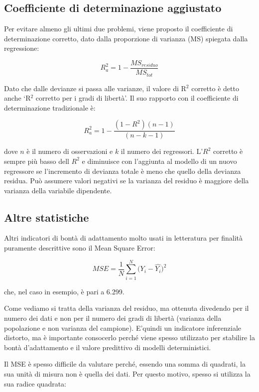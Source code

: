 \documentclass[a4paper,12pt,oneside]{book}
\theoremstyle{definition}
\theoremstyle{definition}
\theoremstyle{definition}
\theoremstyle{remark}
\begin{document}
\subsection{Coefficiente di determinazione
aggiustato}\label{coefficiente-di-determinazione-aggiustato}

Per evitare almeno gli ultimi due problemi, viene proposto il
coefficiente di determinazione corretto, dato dalla proporzione di
varianza (MS) spiegata dalla regressione:

\[R_a^2  = 1 - \frac{MS_{residuo} }{MS_{tot} }\]

Dato che dalle devianze si passa alle varianze, il valore di R\(^2\)
corretto è detto anche `R\(^2\) corretto per i gradi di libertà'. Il suo
rapporto con il coefficiente di determinazione tradizionale è:

\[ R_a^2  = 1 - \frac{\left( {1 - R^2 } \right)\left( {n - 1} \right)}{\left( {n - k - 1} \right)} \]

dove \(n\) è il numero di osservazioni e \(k\) il numero dei regressori.
L'\(R^2\) corretto è sempre più basso dell \(R^2\) e diminuisce con
l'aggiunta al modello di un nuovo regressore se l'incremento di devianza
totale è meno che quello della devianza residua. Può assumere valori
negativi se la varianza del residuo è maggiore della varianza della
variabile dipendente.

\subsection{Altre statistiche}\label{altre-statistiche}

Altri indicatori di bontà di adattamento molto usati in letteratura per
finalità puramente descrittive sono il Mean Square Error:

\[MSE = \frac{1}{N}\sum\limits_{i = 1}^N {(Y_i  - } \widehat{Y_i })^2\]

che, nel caso in esempio, è pari a 6.299.

Come vediamo si tratta della varianza del residuo, ma ottenuta divedendo
per il numero dei dati e non per il numero dei gradi di libertà
(varianza della popolazione e non varianza del campione). E'quindi un
indicatore inferenziale distorto, ma è importante consocerlo perché
viene spesso utilizzato per stabilire la bontà d'adattamento e il valore
predittivo di modelli deterministici.

Il MSE è spesso difficile da valutare perché, essendo una somma di
quadrati, la sua unità di misura non è quella dei dati. Per questo
motivo, spesso si utilizza la sua radice quadrata:
\end{document}
